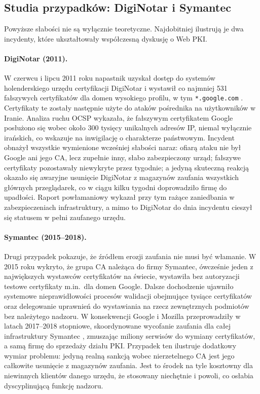 \subsection{Studia przypadków: DigiNotar i Symantec}
\label{subsec:case-studies}

Powyższe słabości nie są wyłącznie teoretyczne. Najdobitniej ilustrują je dwa incydenty, które ukształtowały współczesną dyskusję o Web PKI.

\paragraph{DigiNotar (2011).} W czerwcu i lipcu 2011 roku napastnik uzyskał dostęp do systemów holenderskiego urzędu certyfikacji DigiNotar i wystawił co najmniej 531 fałszywych certyfikatów dla domen wysokiego profilu, w tym \texttt{*.google.com} \cite{foxit-blacktulip}. Certyfikaty te zostały następnie użyte do ataków pośrednika na użytkowników w Iranie. Analiza ruchu OCSP wykazała, że fałszywym certyfikatem Google posłużono się wobec około 300 tysięcy unikalnych adresów IP, niemal wyłącznie irańskich, co wskazuje na inwigilację o charakterze państwowym. Incydent obnażył wszystkie wymienione wcześniej słabości naraz: ofiarą ataku nie był Google ani jego CA, lecz zupełnie inny, słabo zabezpieczony urząd; fałszywe certyfikaty pozostawały niewykryte przez tygodnie; a jedyną skuteczną reakcją okazało się awaryjne usunięcie DigiNotar z magazynów zaufania wszystkich głównych przeglądarek, co w ciągu kilku tygodni doprowadziło firmę do upadłości. Raport powłamaniowy \cite{foxit-blacktulip} wykazał przy tym rażące zaniedbania w zabezpieczeniach infrastruktury, a mimo to DigiNotar do dnia incydentu cieszył się statusem w pełni zaufanego urzędu.

\paragraph{Symantec (2015--2018).} Drugi przypadek pokazuje, że źródłem erozji zaufania nie musi być włamanie. W 2015 roku wykryto, że grupa CA należąca do firmy Symantec, ówcześnie jeden z największych wystawców certyfikatów na świecie, wystawiła bez autoryzacji testowe certyfikaty m.in.\ dla domen Google. Dalsze dochodzenie ujawniło systemowe nieprawidłowości procesów walidacji obejmujące tysiące certyfikatów oraz delegowanie uprawnień do wystawiania na rzecz zewnętrznych podmiotów bez należytego nadzoru. W konsekwencji Google i Mozilla przeprowadziły w latach 2017--2018 stopniowe, skoordynowane wycofanie zaufania dla całej infrastruktury Symantec \cite{google-symantec-distrust}, zmuszając miliony serwisów do wymiany certyfikatów, a samą firmę do sprzedaży działu PKI. Przypadek ten ilustruje dodatkowy wymiar problemu: jedyną realną sankcją wobec nierzetelnego CA jest jego całkowite usunięcie z magazynów zaufania. Jest to środek na tyle kosztowny dla niewinnych klientów danego urzędu, że stosowany niechętnie i powoli, co osłabia dyscyplinującą funkcję nadzoru.

